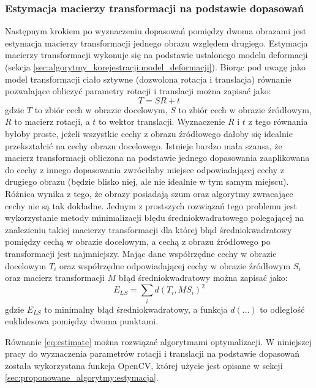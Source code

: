 \subsubsection{Estymacja macierzy transformacji na podstawie dopasowań}

Następnym krokiem po wyznaczeniu dopasowań pomiędzy dwoma obrazami jest estymacja macierzy transformacji jednego obrazu względem drugiego. Estymacja macierzy transformacji wykonuje się na podstawie ustalonego modelu deformacji (sekcja \ref{sec:algorytmy_korejestracji:model_deformacji}). Biorąc pod uwagę jako model transformacji ciało sztywne (dozwolona rotacja i translacja) równanie pozwalające obliczyć parametry rotacji i translacji można zapisać jako:
\begin{equation}
T=SR+t
\end{equation}
gdzie $T$ to zbiór cech w obrazie docelowym, $S$ to zbiór cech w obrazie źródłowym, $R$ to macierz rotacji, a $t$ to wektor translacji. Wyznaczenie $R$ i $t$ z tego równania byłoby proste, jeżeli wszystkie cechy z obrazu źródłowego dałoby się idealnie przekształcić na cechy obrazu docelowego. Istnieje bardzo mała szansa, że macierz transformacji obliczona na podstawie jednego dopasowania zaaplikowana do cechy z innego dopasowania zwróciłaby miejsce odpowiadającej cechy z drugiego obrazu (będzie blisko niej, ale nie idealnie w tym samym miejscu). Różnica wynika z tego, że obrazy posiadają szum oraz algorytmy zwracające cechy nie są tak dokładne. Jednym z prostszych rozwiązań tego problemu jest wykorzystanie metody minimalizacji błędu średniokwadratowego polegającej na znalezieniu takiej macierzy transformacji dla której błąd średniokwadratowy pomiędzy cechą w obrazie docelowym, a cechą z obrazu źródłowego po transformacji jest najmniejszy. Mając dane współrzędne cechy w obrazie docelowym $T_{i}$ oraz współrzędne odpowiadającej cechy w obrazie źródłowym $S_{i}$ oraz macierz transformacji $M$ błąd średniokwadratowy można zapisać jako:
\begin{equation}
E_{LS}=\sum_{i}d(T_{i}, MS_{i})^2
\label{eq:estimate}
\end{equation}
gdzie $E_{LS}$ to minimalny błąd średniokwadratowy, a funkcja $d(...)$ to odległość euklidesowa pomiędzy dwoma punktami.

Równanie \ref{eq:estimate} można rozwiązać algorytmami optymalizacji. W niniejszej pracy do wyznaczenia parametrów rotacji i translacji na podstawie dopasowań została wykorzystana funkcja OpenCV, której użycie jest opisane w sekcji \ref{sec:proponowane_algorytmy:estymacja}.

